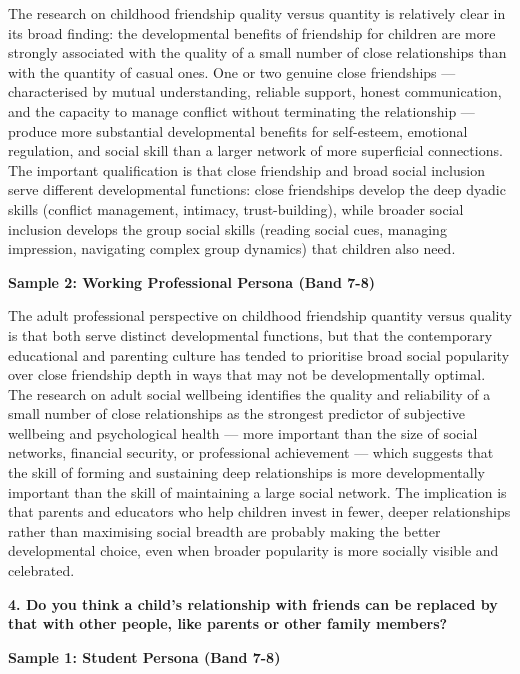 The research on childhood friendship quality versus quantity is relatively clear in its broad finding: the developmental benefits of friendship for children are more strongly associated with the quality of a small number of close relationships than with the quantity of casual ones. One or two genuine close friendships — characterised by mutual understanding, reliable support, honest communication, and the capacity to manage conflict without terminating the relationship — produce more substantial developmental benefits for self-esteem, emotional regulation, and social skill than a larger network of more superficial connections. The important qualification is that close friendship and broad social inclusion serve different developmental functions: close friendships develop the deep dyadic skills (conflict management, intimacy, trust-building), while broader social inclusion develops the group social skills (reading social cues, managing impression, navigating complex group dynamics) that children also need.

\textbf{Sample 2: Working Professional Persona (Band 7-8)}

The adult professional perspective on childhood friendship quantity versus quality is that both serve distinct developmental functions, but that the contemporary educational and parenting culture has tended to prioritise broad social popularity over close friendship depth in ways that may not be developmentally optimal. The research on adult social wellbeing identifies the quality and reliability of a small number of close relationships as the strongest predictor of subjective wellbeing and psychological health — more important than the size of social networks, financial security, or professional achievement — which suggests that the skill of forming and sustaining deep relationships is more developmentally important than the skill of maintaining a large social network. The implication is that parents and educators who help children invest in fewer, deeper relationships rather than maximising social breadth are probably making the better developmental choice, even when broader popularity is more socially visible and celebrated.

\separator

\begin{ieltsquestion}
\textbf{4. Do you think a child's relationship with friends can be replaced by that with other people, like parents or other family members?}
\end{ieltsquestion}
\textbf{Sample 1: Student Persona (Band 7-8)}


